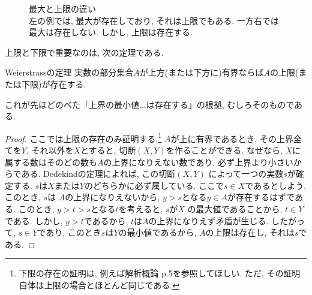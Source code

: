 \documentclass[a4j,dvipdfmx]{jsarticle}
\numberwithin{equation}{section}
\begin{document}
            \begin{figure}[h]
                \centering
                \caption{最大と上限の違い\\{\scriptsize 左の例では, 最大が存在しており, それは上限でもある. 一方右では最大は存在しない. しかし, 上限は存在する.}}
            \end{figure}
            \clearpage
            上限と下限で重要なのは, 次の定理である. 
            \begin{itembox}{Weierstrassの定理}
                実数の部分集合$A$が上方(または下方に)有界ならば$A$の上限(または下限)が存在する.
            \end{itembox}
            これが先ほどのべた「上界の最小値...は存在する」の根拠, むしろそのものである. 
            \begin{proof}
                ここでは上限の存在のみ証明する.\footnote{下限の存在の証明は, 例えば解析概論 p.5を参照してほしい. ただ, その証明自体は上限の場合とほとんど同じである.}
                $A$が上に有界であるとき, その上界全てを$Y$, それ以外を$X$とすると, 切断$(X,Y)$を作ることができる.
                なぜなら, $X$に属する数はそのどの数も$A$の上界になりえない数であり, 必ず上界より小さいからである. Dedekindの定理によれば, この切断$(X,Y)$
                によって一つの実数$s$が確定する. $s$は$X$または$Y$のどちらかに必ず属している. ここで$s\in X$であるとしよう. このとき, $s$は
                $A$の上界になりえないから, $y>s$となる$y\in A$が存在するはずである. このとき, $y>t>s$となる$t$を考えると, $s$が$X$
                の最大値であることから, $t\in Y$である. しかし, $y>t$であるから, $t$は$A$の上界になりえず矛盾が生じる.
                したがって, $s\in Y$であり, このとき$s$は$Y$の最小値であるから, $A$の上限は存在し, それは$s$である.
            \end{proof}
\end{document}
